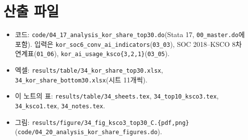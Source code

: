 \documentclass[11pt]{article}
\begin{document}
\section{산출 파일}

\begin{itemize}[leftmargin=*]
  \item 코드: \texttt{code/04\_17\_analysis\_kor\_share\_top30.do}(Stata 17, \texttt{00\_master.do}에 포함). 입력은 \texttt{kor\_soc6\_conv\_ai\_indicators}(\texttt{03\_03}), SOC 2018--KSCO 8차 연계표(\texttt{01\_06}), \texttt{kor\_ai\_usage\_ksco\{3,2,1\}}(\texttt{03\_05}).
  \item 엑셀: \texttt{results/table/34\_kor\_share\_top30.xlsx}, \texttt{34\_kor\_share\_bottom30.xlsx}(시트 11개씩).
  \item 이 노트의 표: \texttt{results/table/34\_sheets.tex}, \texttt{34\_top10\_ksco3.tex}, \texttt{34\_ksco1.tex}, \texttt{34\_notes.tex}.
  \item 그림: \texttt{results/figure/34\_fig\_ksco3\_top30\_C.\{pdf,png\}}(\texttt{code/04\_20\_analysis\_kor\_share\_figures.do}).
\end{itemize}
\end{document}
